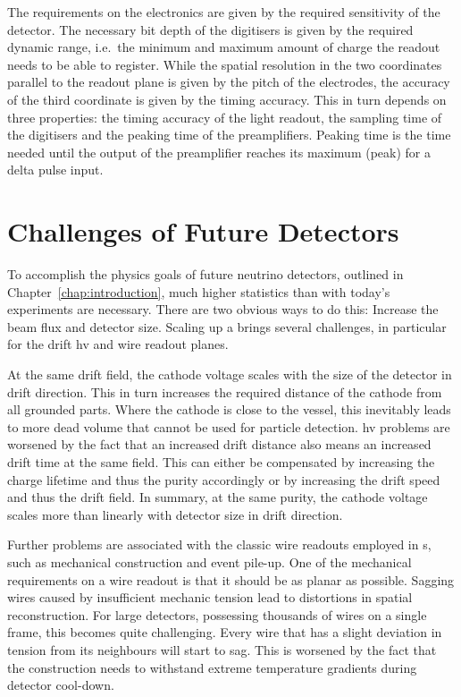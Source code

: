 The requirements on the electronics are given by the required sensitivity of the detector.
The necessary bit depth of the digitisers is given by the required dynamic range, i.e.\ the minimum and maximum amount of charge the readout needs to be able to register.
While the spatial resolution in the two coordinates parallel to the readout plane is given by the pitch of the electrodes, the accuracy of the third coordinate is given by the timing accuracy.
This in turn depends on three properties: the timing accuracy of the light readout, the sampling time of the digitisers and the peaking time of the preamplifiers.
Peaking time is the time needed until the output of the preamplifier reaches its maximum (peak) for a delta pulse input.


\section{Challenges of Future Detectors}
\label{sec:lartpc_challenges}

To accomplish the physics goals of future neutrino detectors, outlined in Chapter~\ref{chap:introduction}, much higher statistics than with today's experiments are necessary.
There are two obvious ways to do this: Increase the beam flux and detector size.
Scaling up a \lartpc{} brings several challenges, in particular for the drift \gls{hv} and wire readout planes.

At the same drift field, the cathode voltage scales with the size of the detector in drift direction.
This in turn increases the required distance of the cathode from all grounded parts.
Where the cathode is close to the \lar{} vessel, this inevitably leads to more dead volume that cannot be used for particle detection.
\gls{hv} problems are worsened by the fact that an increased drift distance also means an increased drift time at the same field.
This can either be compensated by increasing the charge lifetime and thus the \lar{} purity accordingly or by increasing the drift speed and thus the drift field.
In summary, at the same \lar{} purity, the cathode voltage scales more than linearly with detector size in drift direction.

Further problems are associated with the classic wire readouts employed in \lartpc{}s, such as mechanical construction and event pile-up.
One of the mechanical requirements on a wire readout is that it should be as planar as possible.
Sagging wires caused by insufficient mechanic tension lead to distortions in spatial reconstruction.
For large detectors, possessing thousands of wires on a single frame, this becomes quite challenging.
Every wire that has a slight deviation in tension from its neighbours will start to sag.
This is worsened by the fact that the construction needs to withstand extreme temperature gradients during detector cool-down.

